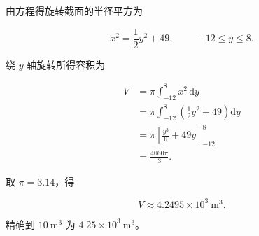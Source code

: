 \begin{answer}

由方程得旋转截面的半径平方为

\nopagebreak[4]
\[
x^2=\frac12y^2+49,\qquad -12\le y\le8.
\]

绕 $y$ 轴旋转所得容积为

\nopagebreak[4]
\[
\begin{aligned}
V
&=\pi\int_{-12}^{8}x^2\,\mathrm dy\\
&=\pi\int_{-12}^{8}\left(\frac12y^2+49\right)\mathrm dy\\
&=\pi\left[\frac{y^3}{6}+49y\right]_{-12}^{8}\\
&=\frac{4060\pi}{3}.
\end{aligned}
\]

取 $\pi=3.14$，得

\nopagebreak[4]
\[
V\approx4.2495\times10^3\ \mathrm m^3.
\]

精确到 $10\ \mathrm m^3$ 为 $4.25\times10^3\ \mathrm m^3$。



\end{answer}
